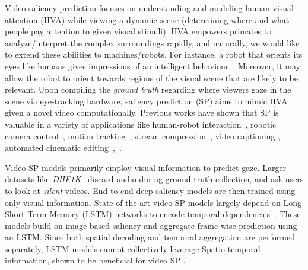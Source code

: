 \documentclass[letterpaper, 10 pt, conference]{ieeeconf}  \usepackage{times}
\begin{document}
Video saliency prediction focuses on understanding and modeling human visual attention (HVA) while viewing a dynamic scene (determining where and what people pay attention to given visual stimuli). HVA empowers primates to analyze/interpret the complex surroundings rapidly, and naturally, we would like to extend these abilities to machines/robots. For instance, a robot that orients its eyes like humans gives impressions of an intelligent behaviour~\cite{butko2008visual}. Moreover, it may allow the robot to orient towards regions of the visual scene that are likely to be relevant. Upon compiling the \emph{ground truth} regarding where viewers gaze in the scene via eye-tracking hardware, saliency prediction (SP) aims to mimic HVA given a novel video computationally. Previous works have shown that SP is valuable in a variety of applications like human-robot interaction~\cite{ferreira2014attentional, schillaci2013evaluating, chang2019salgaze, mavani2017facial}, robotic camera control~\cite{butko2008visual}, motion tracking~\cite{zhang2009visual}, stream compression~\cite{hadizadeh2013saliency, gupta2013visual}, video captioning \cite{nguyen2013static}, automated cinematic editing~\cite{moorthy2020gazed},~\etc.




























Video SP models primarily employ visual information to predict gaze. Larger datasets like \emph{DHF1K}~\cite{wang2018revisiting} discard audio during ground truth collection, and ask users to look at \emph{silent} videos. End-to-end deep saliency models are then trained using only visual information. State-of-the-art video SP models largely depend on Long Short-Term Memory (LSTM) networks to encode temporal dependencies~\cite{droste2020unified, wu2020salsac, linardos2019simple}. These models build on image-based saliency and aggregate frame-wise prediction using an LSTM. Since both spatial decoding and temporal aggregation are performed separately, LSTM models cannot collectively leverage Spatio-temporal information, shown to be beneficial for video SP \cite{min2019tased}.
\end{document}
